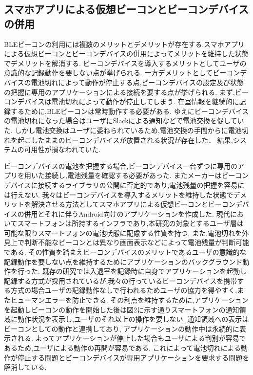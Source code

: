 
\subsection{スマホアプリによる仮想ビーコンとビーコンデバイスの併用}

 BLEビーコンの利用には複数のメリットとデメリットが存在する,スマホアプリによる仮想ビーコンとビーコンデバイスの併用によってメリットを維持した状態でデメリットを解消する.
 ビーコンデバイスを導入するメリットとしてユーザの意識的な記録動作を要しない点が挙げられる.
一方デメリットとしてビーコンデバイスの電池切れによって動作が停止する点,ビーコンデバイスの設定及び状態の把握に専用のアプリケーションによる接続を要する点が挙げられる.
まず,ビーコンデバイスは電池切れによって動作が停止してしまう.
在室情報を継続的に記録するために,BLEビーコンは常時動作する必要がある.
ゆえにビーコンデバイスの電池切れになった場合はユーザにSlackによる通知などで電池交換を促していた.
しかし電池交換はユーザに委ねられているため,電池交換の手間からに電池切れを起こしたままのビーコンデバイスが放置される状況が存在した．
結果,システムの可用性が損なわれていた.

 ビーコンデバイスの電池を把握する場合,ビーコンデバイス一台ずつに専用のアプリを用いた接続し,電池残量を確認する必要があった.
またメーカーはビーコンデバイスに接続するライブラリの公開に否定的であり,電池残量の把握を容易には行えない.
我々はビーコンデバイスを導入するメリットを維持した状態でデメリットを解決させる方法としてスマホアプリによる仮想ビーコンとビーコンデバイスの併用とそれに伴うAndroid向けのアプリケーションを作成した.
 現代においてスマートフォンは所持するインフラであり,本研究の対象とするユーザ層は可能な限りスマートフォンの電池状態に配慮する性質を持つ.
また,電池切れを外見上で判断不能なビーコンとは異なり画面表示などによって電池残量が判断可能である.
その性質を踏まえビーコンデバイスのメリットであるユーザの意識的な記録動作を要しない点を維持するためにアプリケーションのバックグラウンド動作を行った.
 既存の研究では入退室を記録時に自身でアプリケーションを起動し記録する方式が採用されているが,我々の行っているビーコンデバイスを携帯する方式の場合ユーザの記録動作なしで行われるためユーザの協力を得やすく,またヒューマンエラーを防止できる.
その利点を維持するために,アプリケーションを起動しビーコンの動作を開始した後は図2に示す通りスマートフォンの通知領域に動作状況を表示し,ユーザのそれ以上の操作を要しない.
通知領域への表示はビーコンとしての動作と連携しており, アプリケーションの動作中は永続的に表示される.
よってアプリケーションが停止した場合もユーザによる判別が容易であるため,ユーザによる動作の再開が容易である.
これによって電池切れによる動作が停止する問題とビーコンデバイスが専用アプリケーションを要求する問題を解消している.

